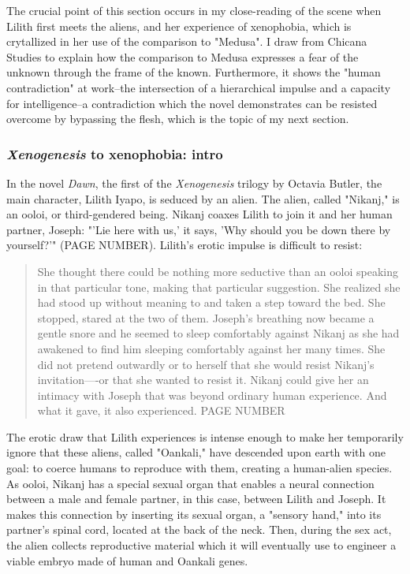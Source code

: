 \documentclass[11pt]{article}
\begin{document}
The crucial point of this section occurs in my close-reading of the
scene when Lilith first meets the aliens, and her experience of
xenophobia, which is crytallized in her use of the comparison to
"Medusa". I draw from Chicana Studies to explain how the comparison to
Medusa expresses a fear of the unknown through the frame of the
known. Furthermore, it shows the "human contradiction" at work--the
intersection of a hierarchical impulse and a capacity for
intelligence--a contradiction which the novel demonstrates can be
resisted overcome by bypassing the flesh, which is the topic of my
next section.

\subsubsection{\emph{Xenogenesis} to xenophobia: intro}
\label{sec:org7cac079}
In the novel \emph{Dawn}, the first of the \emph{Xenogenesis} trilogy by Octavia
Butler, the main character, Lilith Iyapo, is seduced by an alien. The
alien, called "Nikanj," is an ooloi, or third-gendered being. Nikanj
coaxes Lilith to join it and her human partner, Joseph: "'Lie here
with us,' it says, 'Why should you be down there by yourself?'" (PAGE
NUMBER). Lilith's erotic impulse is difficult to resist:
\begin{quote}
She thought there could be nothing more seductive than an ooloi
speaking in that particular tone, making that particular
suggestion. She realized she had stood up without meaning to and taken
a step toward the bed. She stopped, stared at the two of
them. Joseph’s breathing now became a gentle snore and he seemed to
sleep comfortably against Nikanj as she had awakened to find him
sleeping comfortably against her many times. She did not pretend
outwardly or to herself that she would resist Nikanj’s invitation—-or
that she wanted to resist it. Nikanj could give her an intimacy with
Joseph that was beyond ordinary human experience. And what it gave, it
also experienced. PAGE NUMBER
\end{quote}
The erotic draw that Lilith experiences is intense enough to make her
temporarily ignore that these aliens, called "Oankali," have descended
upon earth with one goal: to coerce humans to reproduce with them,
creating a human-alien species. As ooloi, Nikanj has a special sexual
organ that enables a neural connection between a male and female
partner, in this case, between Lilith and Joseph. It makes this
connection by inserting its sexual organ, a "sensory hand," into its
partner's spinal cord, located at the back of the neck. Then, during
the sex act, the alien collects reproductive material which it will
eventually use to engineer a viable embryo made of human and Oankali
genes.
\end{document}
